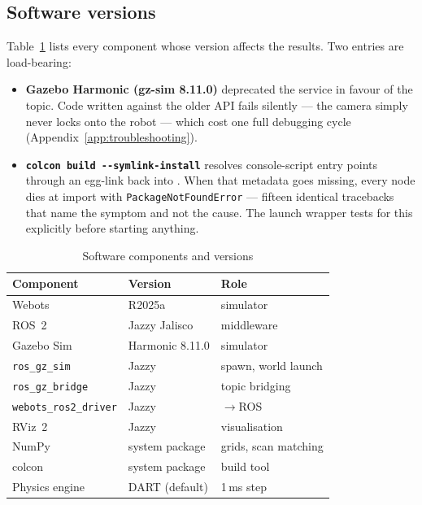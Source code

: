 \subsection{Software versions}

Table~\ref{tab:versions} lists every component whose version affects the
results. Two entries are load-bearing:

\begin{itemize}[leftmargin=*,itemsep=1pt,topsep=2pt]
  \item \textbf{Gazebo Harmonic (gz-sim 8.11.0)} deprecated the
         service in favour of the
         topic. Code written against the older API
        fails silently --- the camera simply never locks onto the robot
        --- which cost one full debugging cycle
        (Appendix~\ref{app:troubleshooting}).
  \item \textbf{\texttt{colcon build -{}-symlink-install}} resolves
        console-script entry points through an egg-link back into
        . When that metadata goes missing, every node
        dies at import with \texttt{PackageNotFoundError} --- fifteen
        identical tracebacks that name the symptom and not the cause.
        The launch wrapper tests for this explicitly before starting
        anything.
\end{itemize}

\begin{table}[!t]
\caption{Software components and versions}
\label{tab:versions}
\centering\footnotesize
\begin{tabular}{@{}lll@{}}
\toprule
\textbf{Component} & \textbf{Version} & \textbf{Role}\\
\midrule
Webots                        & R2025a          & \phaseA{} simulator\\
ROS~2                         & Jazzy Jalisco   & \phaseB{} middleware\\
Gazebo Sim                    & Harmonic 8.11.0 & \phaseB{} simulator\\
\texttt{ros\_gz\_sim}         & Jazzy           & spawn, world launch\\
\texttt{ros\_gz\_bridge}      & Jazzy           & topic bridging\\
\texttt{webots\_ros2\_driver} & Jazzy           & \phaseA{}$\rightarrow$ROS\\
RViz~2                        & Jazzy           & visualisation\\
NumPy                         & system package  & grids, scan matching\\
colcon                        & system package  & build tool\\
Physics engine                & DART (default)  & 1\,ms step\\
\bottomrule
\end{tabular}
\end{table}

